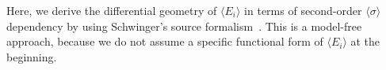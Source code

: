 \documentclass[prx,twocolumn,twoside,showpacs,superscriptaddress]{revtex4-1}
\begin{document}
Here, we derive the differential geometry of $\langle E_i \rangle$ in terms of {\color{blue}second-order} $\langle \sigma \rangle$ dependency by using  Schwinger's source formalism~\cite{schwinger1953,toms2007schwinger}.
This is a model-free approach, because we do not assume a specific functional form of $\langle E_i \rangle$ at the beginning.
\end{document}
